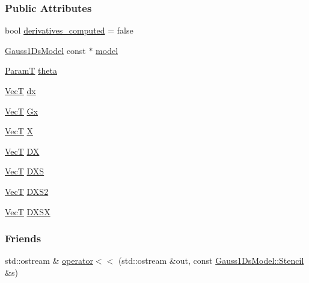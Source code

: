 \subsubsection*{Public Attributes}
\begin{DoxyCompactItemize}
\item 
bool \hyperlink{classmappel_1_1Gauss1DsModel_1_1Stencil_a1c6765fd3a9e915afcb382f74602d502}{derivatives\+\_\+computed} = false
\item 
\hyperlink{classmappel_1_1Gauss1DsModel}{Gauss1\+Ds\+Model} const $\ast$ \hyperlink{classmappel_1_1Gauss1DsModel_1_1Stencil_aea5b9e51d1fc6471820598c321472bfe}{model}
\item 
\hyperlink{classmappel_1_1Gauss1DsModel_1_1Stencil_adaba50464646fb95c5853b5c15365ed2}{ParamT} \hyperlink{classmappel_1_1Gauss1DsModel_1_1Stencil_ab1acb6728b521c0ba62d06bc9a92ae79}{theta}
\item 
\hyperlink{namespacemappel_a2225ad69f358daa3f4f99282a35b9a3a}{VecT} \hyperlink{classmappel_1_1Gauss1DsModel_1_1Stencil_a89a81cafd54335711f4ae04c0bd8fb26}{dx}
\item 
\hyperlink{namespacemappel_a2225ad69f358daa3f4f99282a35b9a3a}{VecT} \hyperlink{classmappel_1_1Gauss1DsModel_1_1Stencil_af1658c447b8050ad4c1c764ec7d8d552}{Gx}
\item 
\hyperlink{namespacemappel_a2225ad69f358daa3f4f99282a35b9a3a}{VecT} \hyperlink{classmappel_1_1Gauss1DsModel_1_1Stencil_aecf000ca64a08c81d6d576500ff37026}{X}
\item 
\hyperlink{namespacemappel_a2225ad69f358daa3f4f99282a35b9a3a}{VecT} \hyperlink{classmappel_1_1Gauss1DsModel_1_1Stencil_a6f39d486d37c774ac2509a403a19520e}{DX}
\item 
\hyperlink{namespacemappel_a2225ad69f358daa3f4f99282a35b9a3a}{VecT} \hyperlink{classmappel_1_1Gauss1DsModel_1_1Stencil_a0165665a066559026c1c66f75d825a47}{D\+XS}
\item 
\hyperlink{namespacemappel_a2225ad69f358daa3f4f99282a35b9a3a}{VecT} \hyperlink{classmappel_1_1Gauss1DsModel_1_1Stencil_a846e15fa6424d1b9193acc3c09887e89}{D\+X\+S2}
\item 
\hyperlink{namespacemappel_a2225ad69f358daa3f4f99282a35b9a3a}{VecT} \hyperlink{classmappel_1_1Gauss1DsModel_1_1Stencil_ad89b7a15072ed14bd773ffce986f2e95}{D\+X\+SX}
\end{DoxyCompactItemize}
\subsubsection*{Friends}
\begin{DoxyCompactItemize}
\item 
std\+::ostream \& \hyperlink{classmappel_1_1Gauss1DsModel_1_1Stencil_a838c90527d5e592d4f22884335221498}{operator$<$$<$} (std\+::ostream \&out, const \hyperlink{classmappel_1_1Gauss1DsModel_1_1Stencil}{Gauss1\+Ds\+Model\+::\+Stencil} \&s)
\end{DoxyCompactItemize}


